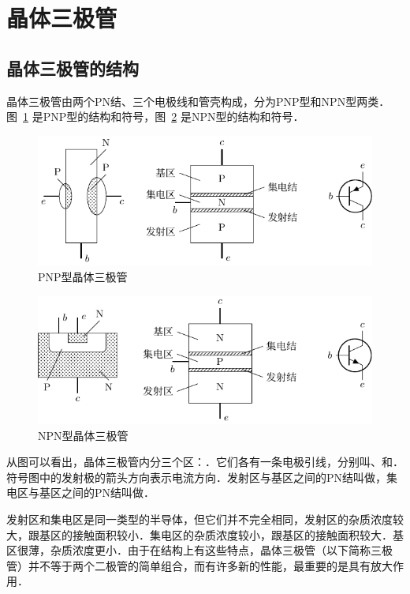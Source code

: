 \section{晶体三极管}

\subsection{晶体三极管的结构}

晶体三极管由两个PN结、三个电极线和管壳构成，分为PNP型和NPN型两类．
图~\ref{fig_B_8-28} 是PNP型的结构和符号，图~\ref{fig_B_8-29} 是NPN型的结构和符号．
\begin{figure}[htbp]
    \centering
    \includegraphics{fig/B/8-28.pdf}
    \caption{PNP型晶体三极管}\label{fig_B_8-28}
\end{figure}

\begin{figure}[htbp]
    \centering
    \includegraphics{fig/B/8-29.pdf}
    \caption{NPN型晶体三极管}\label{fig_B_8-29}
\end{figure}

从图可以看出，晶体三极管内分三个区：．它们各有一条电极引线，分别叫、和．符号图中的发射极的箭头方向表示电流方向．发射区与基区之间的PN结叫做，集电区与基区之间的PN结叫做．

发射区和集电区是同一类型的半导体，但它们并不完全相同，发射区的杂质浓度较大，跟基区的接触面积较小．集电区的杂质浓度较小，跟基区的接触面积较大．基区很薄，杂质浓度更小．由于在结构上有这些特点，晶体三极管（以下简称三极管）并不等于两个二极管的简单组合，而有许多新的性能，最重要的是具有放大作用．

